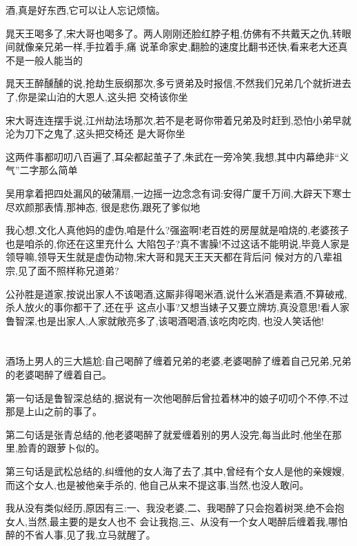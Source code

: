 ﻿\documentclass[12pt]{article}
\begin{document}
酒,真是好东西,它可以让人忘记烦恼。

晁天王喝多了,宋大哥也喝多了。两人刚刚还脸红脖子粗,仿佛有不共戴天之仇,转眼间就像亲兄弟一样,手拉着手,痛
说革命家史,翻脸的速度比翻书还快,看来老大还真不是一般人能当的

晁天王醉醺醺的说,抢劫生辰纲那次,多亏贤弟及时报信,不然我们兄弟几个就折进去了,你是梁山泊的大恩人,这头把
交椅该你坐\dldots

宋大哥连连摆手说,江州劫法场那次,若不是老哥你带着兄弟及时赶到,恐怕小弟早就沦为刀下之鬼了,这头把交椅还
是大哥你坐\dldots

这两件事都叨叨八百遍了,耳朵都起茧子了,朱武在一旁冷笑,我想,其中内幕绝非``义气''二字那么简单\dldots

吴用拿着把四处漏风的破蒲扇,一边摇一边念念有词:安得广厦千万间,大辟天下寒士尽欢颜\dldots 那表情,那神态,
很是悲伤,跟死了爹似地

我心想,文化人真他妈的虚伪,咱是什么?强盗啊!老百姓的房屋就是咱烧的,老婆孩子也是咱杀的,你还在这里充什么
大陷包子?真不害臊!不过这话不能明说,毕竟人家是领导嘛,领导天生就是虚伪动物,宋大哥和晁天王天天都在背后问
候对方的八辈祖宗,见了面不照样称兄道弟?

公孙胜是道家,按说出家人不该喝酒,这厮非得喝米酒,说什么米酒是素酒,不算破戒,杀人放火的事你都干了,还在乎
这点小事?又想当婊子又要立牌坊,真没意思!看人家鲁智深,也是出家人,人家就敞亮多了,该喝酒喝酒,该吃肉吃肉,
也没人笑话他!

\section{}

酒场上男人的三大尴尬:自己喝醉了缠着兄弟的老婆,老婆喝醉了缠着自己兄弟,兄弟的老婆喝醉了缠着自己。

第一句话是鲁智深总结的,据说有一次他喝醉后曾拉着林冲的娘子叨叨个不停,不过那是上山之前的事了。

第二句话是张青总结的,他老婆喝醉了就爱缠着别的男人没完,每当此时,他坐在那里,脸青的跟萝卜似的。

第三句话是武松总结的,纠缠他的女人海了去了,其中,曾经有个女人是他的亲嫂嫂,而这个女人,也是被他亲手杀的,
他自己从来不提这事,当然,也没人敢问。

我从没有类似经历,原因有三:一、我没老婆,二、我喝醉了只会抱着树哭,绝不会抱女人,当然,最主要的是女人也不
会让我抱,三、从没有一个女人喝醉后缠着我,哪怕醉的不省人事,见了我,立马就醒了。

\section{}
\end{document}
